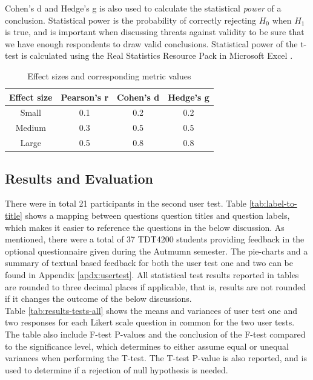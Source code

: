 Cohen's d and Hedge's g is also used to calculate the statistical \textit{power} of a conclusion. Statistical power is the probability of correctly rejecting $H_0$ when $H_1$ is true, and is important when discussing threats against validity to be sure that we have enough respondents to draw valid conclusions. Statistical power of the t-test is calculated using the Real Statistics Resource Pack in Microsoft Excel \cite{RSRP}.

\begin{table}[t!]
    \centering
    \begin{tabular}{ | c | c | c | c |}
    \hline
    \textbf{Effect size} & \textbf{Pearson's r} & \textbf{Cohen's d} & \textbf{Hedge's g} \\ \hline
    Small & 0.1 & 0.2 & 0.2 \\ \hline
    Medium & 0.3 & 0.5 & 0.5 \\ \hline
    Large & 0.5 & 0.8 & 0.8 \\ \hline
    \end{tabular}
    \caption{Effect sizes and corresponding metric values}
    \label{tab:effect-size}
\end{table}

\subsection{Results and Evaluation}
\label{sub-sec:user-testing-results}
There were in total 21 participants in the second user test. Table \ref{tab:label-to-title} shows a mapping between questions question titles and question labels, which makes it easier to reference the questions in the below discussion. As mentioned, there were a total of 37 TDT4200 students providing feedback in the optional questionnaire given during the Autmumn semester. The pie-charts and a summary of textual based feedback for both the user test one and two can be found in Appendix \ref{apdx:usertest}. All statistical test results reported in tables are rounded to three decimal places if applicable, that is, results are not rounded if it changes the outcome of the below discussions. \\

Table \ref{tab:results-tests-all} shows the means and variances of user test one and two responses for each Likert scale question in common for the two user tests. The table also include F-test P-values and the conclusion of the F-test compared to the significance level, which determines to either assume equal or unequal variances when performing the T-test. The T-test P-value is also reported, and is used to determine if a rejection of null hypothesis is needed. \\

